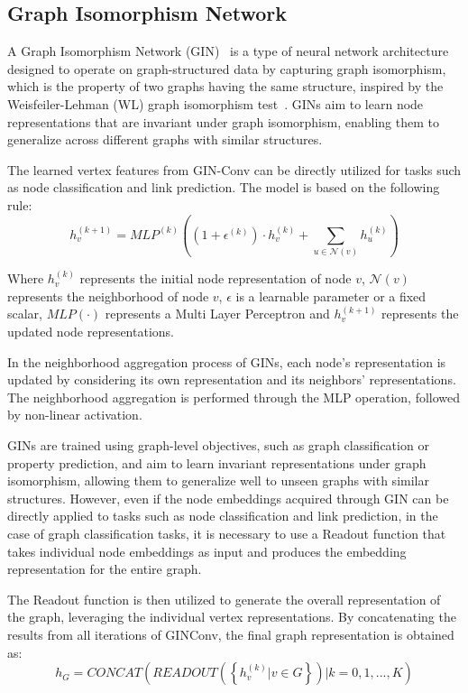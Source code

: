 \subsection{Graph Isomorphism Network}
\label{subsec:graph_isomorphism_network}%

A Graph Isomorphism Network (GIN)~\cite{xu2019powerful, daigavane2021understanding} is a type of neural network architecture designed to operate on graph-structured data by capturing graph isomorphism, which is the property of two graphs having the same structure, inspired by the Weisfeiler-Lehman (WL) graph isomorphism test~\cite{xu2019powerful}.
GINs aim to learn node representations that are invariant under graph isomorphism, enabling them to generalize across different graphs with similar structures.

The learned vertex features from GIN-Conv can be directly utilized for tasks such as node classification and link prediction.
The model is based on the following rule:
\begin{equation}
    \label{eq:gin_function}
    h_v^{(k+1)} = MLP^{(k)} \left( \left( 1 + \epsilon^{(k)} \right) \cdot h_v^{(k)} + \sum_{u \in \mathcal{N}(v)} h_u^{(k)} \right)
\end{equation}

Where $h_v^{(k)}$ represents the initial node representation of node $v$, $\mathcal{N}(v)$ represents the neighborhood of node $v$, $\epsilon$ is a learnable
parameter or a fixed scalar, $MLP( \cdot )$ represents a Multi Layer Perceptron and $h_v^{(k+1)}$ represents the updated node representations.

In the neighborhood aggregation process of GINs, each node's representation is updated by considering its own representation and its neighbors' representations.
The neighborhood aggregation is performed through the MLP operation, followed by non-linear activation.

GINs are trained using graph-level objectives, such as graph classification or property prediction, and aim to learn invariant representations under graph isomorphism, allowing them to generalize well to unseen graphs with similar structures.
However, even if the node embeddings acquired through GIN can be directly applied to tasks such as node classification and link prediction, in the case of graph classification tasks, it is necessary to use a Readout function that takes individual node embeddings as input and produces the embedding representation for the entire graph.

The Readout function is then utilized to generate the overall representation of the graph, leveraging the individual vertex representations.
By concatenating the results from all iterations of GINConv, the final graph representation is obtained as:
\begin{equation}
    \label{eq:gin_readout}
    h_G = CONCAT \left( READOUT \left( \left\{ h_v^{(k)} | v \in G \right\} \right) | k = 0, 1, ..., K \right)
\end{equation}

